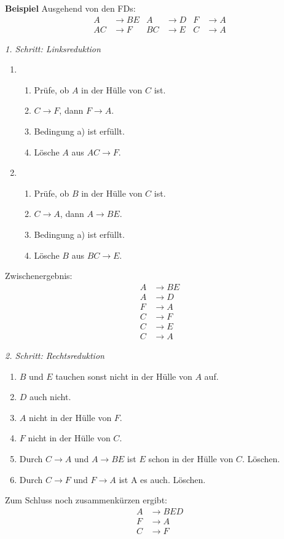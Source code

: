 \documentclass[a4paper,parskip=half*,DIV=15,fontsize=11pt]{scrartcl}
\begin{document}
\textbf{Beispiel} Ausgehend von den FDs:
\begin{align*}
A &\to BE & A &\to D & F &\to A \\ AC &\to F & BC &\to E & C &\to A
\end{align*}
\begin{minipage}[t]{0.49\textwidth}
\emph{1. Schritt: Linksreduktion}
\begin{enumerate}
\item
\begin{enumerate}
\item Prüfe, ob $A$ in der Hülle von $C$ ist.
\item $C \to F$, dann $F \to A$.
\item Bedingung a) ist erfüllt.
\item Lösche $A$ aus $AC \to F$.
\end{enumerate}
\item
\begin{enumerate}
\item Prüfe, ob $B$ in der Hülle von $C$ ist.
\item $C \to A$, dann $A \to BE$.
\item Bedingung a) ist erfüllt.
\item Lösche $B$ aus $BC \to E$.
\end{enumerate}
\end{enumerate}
Zwischenergebnis:
\begin{align*}
A &\to BE \\ A &\to D \\ F &\to A \\ C &\to F \\ C &\to E \\ C &\to A
\end{align*}
\end{minipage}
\hspace{0.02\textwidth}
\begin{minipage}[t]{0.49\textwidth}
\emph{2. Schritt: Rechtsreduktion}
\begin{enumerate}\itemsep0em
\item $B$ und $E$ tauchen sonst nicht in der Hülle von $A$ auf.
\item $D$ auch nicht.
\item $A$ nicht in der Hülle von $F$.
\item $F$ nicht in der Hülle von $C$.
\item Durch $C \to A$ und $A \to BE$ ist $E$ schon in der Hülle von $C$. Löschen.
\item Durch $C \to F$ und $F \to A$ ist A es auch. Löschen.
\end{enumerate}
Zum Schluss noch zusammenkürzen ergibt:
\begin{align*}
A &\to BED \\F &\to A \\ C &\to F
\end{align*}
\end{minipage}
\end{document}
